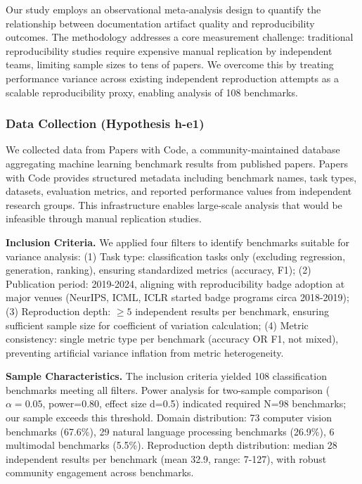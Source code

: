 
Our study employs an observational meta-analysis design to quantify the relationship between documentation artifact quality and reproducibility outcomes. The methodology addresses a core measurement challenge: traditional reproducibility studies require expensive manual replication by independent teams, limiting sample sizes to tens of papers. We overcome this by treating performance variance across existing independent reproduction attempts as a scalable reproducibility proxy, enabling analysis of 108 benchmarks.

\subsubsection{Data Collection (Hypothesis h-e1)}

We collected data from Papers with Code, a community-maintained database aggregating machine learning benchmark results from published papers. Papers with Code provides structured metadata including benchmark names, task types, datasets, evaluation metrics, and reported performance values from independent research groups. This infrastructure enables large-scale analysis that would be infeasible through manual replication studies.

\textbf{Inclusion Criteria.} We applied four filters to identify benchmarks suitable for variance analysis: (1) Task type: classification tasks only (excluding regression, generation, ranking), ensuring standardized metrics (accuracy, F1); (2) Publication period: 2019-2024, aligning with reproducibility badge adoption at major venues (NeurIPS, ICML, ICLR started badge programs circa 2018-2019); (3) Reproduction depth: $\geq 5$ independent results per benchmark, ensuring sufficient sample size for coefficient of variation calculation; (4) Metric consistency: single metric type per benchmark (accuracy OR F1, not mixed), preventing artificial variance inflation from metric heterogeneity.

\textbf{Sample Characteristics.} The inclusion criteria yielded 108 classification benchmarks meeting all filters. Power analysis for two-sample comparison ($\alpha =0.05$, power=0.80, effect size d=0.5) indicated required N=98 benchmarks; our sample exceeds this threshold. Domain distribution: 73 computer vision benchmarks (67.6\%), 29 natural language processing benchmarks (26.9\%), 6 multimodal benchmarks (5.5\%). Reproduction depth distribution: median 28 independent results per benchmark (mean 32.9, range: 7-127), with robust community engagement across benchmarks.

